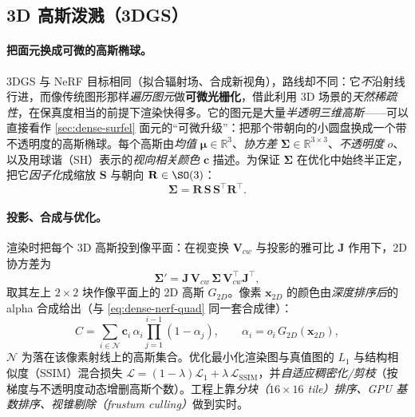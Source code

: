 \subsection{3D 高斯泼溅（3DGS）}
\label{sec:dense-radiance-gs}

\paragraph{把面元换成可微的高斯椭球。}
3DGS\cite{kerbl2023gaussian} 与 NeRF 目标相同（拟合辐射场、合成新视角），路线却不同：它\emph{不}沿射线行进，而像传统图形那样\emph{遍历图元}做\textbf{可微光栅化}，借此利用 3D 场景的\emph{天然稀疏性}，在保真度相当的前提下渲染快得多。它的图元是大量\emph{半透明三维高斯}——可以直接看作 \cref{sec:dense-surfel} 面元的“可微升级”：把那个带朝向的小圆盘换成一个带不透明度的高斯椭球。每个高斯由\emph{均值} $\boldsymbol{\mu}\in\mathbb{R}^3$、\emph{协方差} $\boldsymbol{\Sigma}\in\mathbb{R}^{3\times3}$、\emph{不透明度} $o$、以及用球谐（SH）表示的\emph{视向相关颜色} $\mathbf{c}$ 描述。为保证 $\boldsymbol{\Sigma}$ 在优化中始终半正定，把它\emph{因子化}成缩放 $\mathbf{S}$ 与朝向 $\mathbf{R}\in\SO(3)$：
\begin{equation}
  \boldsymbol{\Sigma}=\mathbf{R}\,\mathbf{S}\,\mathbf{S}^\top\mathbf{R}^\top.
  \label{eq:dense-gs-cov}
\end{equation}

\paragraph{投影、合成与优化。}
渲染时把每个 3D 高斯投到像平面：在视变换 $\mathbf{V}_{cw}$ 与投影的雅可比 $\mathbf{J}$ 作用下，2D 协方差为
\begin{equation}
  \boldsymbol{\Sigma}'=\mathbf{J}\,\mathbf{V}_{cw}\,\boldsymbol{\Sigma}\,\mathbf{V}_{cw}^\top\mathbf{J}^\top,
  \label{eq:dense-gs-proj}
\end{equation}
取其左上 $2\times2$ 块作像平面上的 2D 高斯 $G_{2D}$。像素 $\mathbf{x}_{2D}$ 的颜色由\emph{深度排序后}的 alpha 合成给出（与 \cref{eq:dense-nerf-quad} 同一套合成律）：
\begin{equation}
  C=\sum_{i\in\mathcal{N}}\mathbf{c}_i\,\alpha_i\prod_{j=1}^{i-1}(1-\alpha_j),
  \qquad
  \alpha_i=o_i\,G_{2D}(\mathbf{x}_{2D}),
  \label{eq:dense-gs-blend}
\end{equation}
$\mathcal{N}$ 为落在该像素射线上的高斯集合。优化最小化渲染图与真值图的 $L_1$ 与结构相似度（SSIM）混合损失 $\mathcal{L}=(1-\lambda)\mathcal{L}_1+\lambda\,\mathcal{L}_{\mathrm{SSIM}}$，并\emph{自适应稠密化/剪枝}（按梯度与不透明度动态增删高斯个数）。工程上靠\emph{分块（$16\times16$ tile）排序、GPU 基数排序、视锥剔除（frustum culling）}做到实时。

